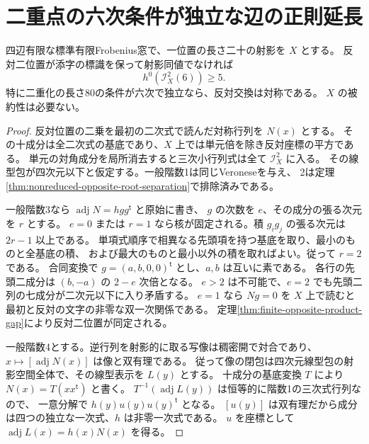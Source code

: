 \section{二重点の六次条件が独立な辺の正則延長}
\label{sec:opposite-sextic-threshold}
\begin{theorem}\label{thm:opposite-sextic-threshold}
四辺有限な標準有限Frobenius窓で、一位置の長さ二十の射影を $X$ とする。
反対二位置が添字の標識を保って射影同値でなければ
\[
                  h^0(\mathcal I_X^2(6))\ge5 .
\]
特に二重化の長さ80の条件が六次で独立なら、反対交換は対称である。
$X$ の被約性は必要ない。
\end{theorem}
\begin{proof}
反対位置の二乗を最初の二次式で読んだ対称行列を $N(x)$ とする。
その十成分は全二次式の基底であり、$X$ 上では単元倍を除き反対座標の平方である。
単元の対角成分を局所消去すると三次小行列式は全て $\mathcal I_X^2$ に入る。
その線型包が四次元以下と仮定する。一般階数1は同じVeroneseを与え、
2は定理\ref{thm:nonreduced-opposite-root-separation}で排除済みである。

一般階数3なら $\operatorname{adj}N=hgg^{\mathsf t}$ と原始に書き、
$g$ の次数を $e$、その成分の張る次元を $r$ とする。
$e=0$ または $r=1$ なら核が固定される。積 $g_i g_j$ の張る次元は $2r-1$ 以上である。
単項式順序で相異なる先頭項を持つ基底を取り、最小のものと全基底の積、
および最大のものと最小以外の積を取ればよい。従って $r=2$ である。
合同変換で $g=(a,b,0,0)^{\mathsf t}$ とし、$a,b$ は互いに素である。
各行の先頭二成分は $(b,-a)$ の $2-e$ 次倍となる。
$e>2$ は不可能で、$e=2$ でも先頭二列の七成分が二次元以下に入り矛盾する。
$e=1$ なら $Ng=0$ を $X$ 上で読むと最初と反対の文字の非零な双一次関係である。
定理\ref{thm:finite-opposite-product-gap}により反対二位置が同定される。

一般階数4とする。逆行列を射影的に取る写像は稠密開で対合であり、
$x\mapsto[\operatorname{adj}N(x)]$ は像と双有理である。
従って像の閉包は四次元線型包の射影空間全体で、その線型表示を $L(y)$ とする。
十成分の基底変換 $T$ により $N(x)=T(xx^{\mathsf t})$ と書く。
$T^{-1}(\operatorname{adj}L(y))$ は恒等的に階数1の三次式行列なので、
一意分解で $h(y)u(y)u(y)^{\mathsf t}$ となる。
$[u(y)]$ は双有理だから成分は四つの独立な一次式、$h$ は非零一次式である。
$u$ を座標として $\operatorname{adj}L(x)=h(x)N(x)$ を得る。


\end{proof}
